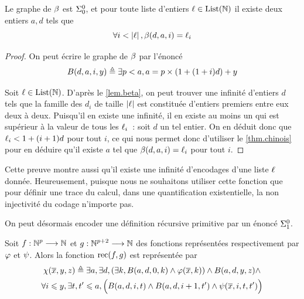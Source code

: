 \begin{proposition}\label{prop.beta.bis}
  Le graphe de $\beta$ est $\Sigma^0_{0}$, et pour toute liste d'entiers
  $\ell \in \operatorname{List}(\mathbb N)$ il existe deux entiers $a,d$ tels que
  \[\forall i < \left\vert\ell\right\vert, \beta(d,a,i) = \ell_i\]
\end{proposition}

\begin{proof}
  On peut écrire le graphe de $\beta$ par l'énoncé
  \[B(d,a,i,y) \triangleq \exists p < a, a = p \times (1 + (1 + i) d) + y\]

  Soit $\ell \in \operatorname{List}(\mathbb N)$. D'après le \cref{lem.beta}, on peut trouver
  une infinité d'entiers $d$ tels que la famille des $d_i$ de taille
  $\left\vert\ell\right\vert$ est constituée d'entiers premiers entre eux deux à deux.
  Puisqu'il en existe une infinité, il en existe au moins un qui est supérieur
  à la valeur de tous les $\ell_i$~: soit $d$ un tel entier. On en déduit
  donc que $\ell_i < 1 + (i+1)d$ pour tout $i$, ce qui nous permet donc
  d'utiliser le \cref{thm.chinois} pour en déduire qu'il existe $a$ tel que
  $\beta(d,a,i) = \ell_i$ pour tout $i$.
\end{proof}

\begin{remark}
  Cette preuve montre aussi qu'il existe une infinité d'encodages d'une liste
  $\ell$ donnée. Heureusement, puisque nous ne souhaitons utiliser cette
  fonction que pour définir une trace du calcul, dans une quantification
  existentielle, la non injectivité du codage n'importe pas.
\end{remark}

On peut désormais encoder une définition récursive primitive par un énoncé
$\Sigma^0_{1}$.

\begin{proposition}
  Soit $f : \displaystyle \mathbb N^p \longrightarrow \mathbb N$ et $g : \displaystyle \mathbb N^{p+2} \longrightarrow \mathbb N$ des
  fonctions représentées respectivement par $\varphi$ et $\psi$. Alors la
  fonction $\operatorname{rec}(f,g)$ est représentée par
  \begin{multline*}
    \chi(\overline{x},y,z) \triangleq \exists a, \exists d,
    (\exists k, B(a,d,0,k) \land \varphi(\overline{x}, k)) \land B(a,d,y,z) \land \\
    \forall i \leqslant y, \exists t,t' \leqslant a, \Big(
    B(a,d,i,t) \land B(a,d,i+1,t') \land
    \psi(\overline{x},i,t,t') \Big)
  \end{multline*}
\end{proposition}

